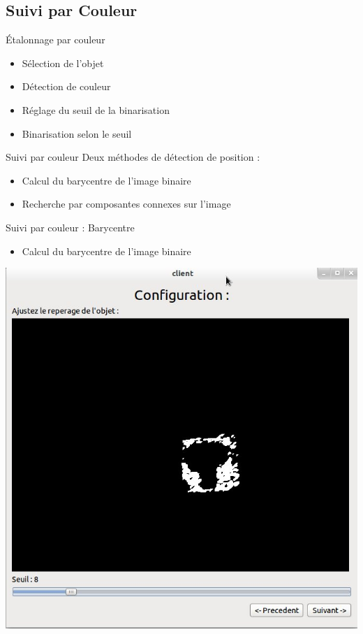 \documentclass{beamer}
\begin{document}
		\subsection{Suivi par Couleur}
		\begin{frame}{Étalonnage par couleur}
			\begin{itemize}
				\item{Sélection de l'objet}
				\item{Détection de couleur}
				\item{Réglage du seuil de la binarisation}
				\item{Binarisation selon le seuil}
			\end{itemize}
		\end{frame}

		\begin{frame}{Suivi par couleur}
			Deux méthodes de détection de position :
			\begin{itemize}
				\item{Calcul du barycentre de l'image binaire}
				\item{Recherche par composantes connexes sur l'image}
			\end{itemize}
		\end{frame}

		\begin{frame}{Suivi par couleur : Barycentre}
			\begin{itemize}
				\item{Calcul du barycentre de l'image binaire}
			\end{itemize}
			\begin{center}
				\includegraphics[scale=0.25]{capture1.jpg}
			\end{center}
		\end{frame}
\end{document}
